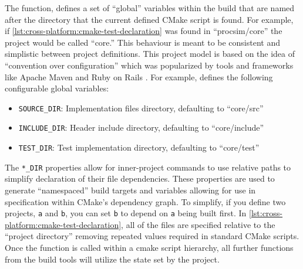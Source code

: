 The function,  defines a set of ``global'' variables within the build that are named after the directory that the current defined CMake script is found. For example, if \cref{lst:cross-platform:cmake-test-declaration} was found in ``procsim/core'' the project would be called ``core.'' This behaviour is meant to be consistent and simplistic between project definitions. This project model is based on the idea of ``convention over configuration'' which was popularized by tools and frameworks like Apache Maven and Ruby on Rails \cite{Maven:StandardDirectoryLayout,Heinemeier:RailsDoctrine}. For example,  defines the following configurable global variables: 
\begin{itemize}
    \item \texttt{SOURCE\_DIR}: Implementation files directory, defaulting to ``core/src''
    \item \texttt{INCLUDE\_DIR}: Header include directory, defaulting to ``core/include''
    \item \texttt{TEST\_DIR}: Test implementation directory, defaulting to ``core/test''
\end{itemize}
The \texttt{*\_DIR} properties allow for inner-project commands to use relative paths to simplify declaration of their file dependencies. These properties are used to generate ``namespaced'' build targets and variables allowing for use in specification within CMake's dependency graph. To simplify, if you define two projects, \verb|a| and \verb|b|, you can set \verb|b| to depend on \verb|a| being built first. In \cref{lst:cross-platform:cmake-test-declaration}, all of the files are specified relative to the ``project directory'' removing repeated values required in standard CMake scripts. Once the  function is called within a cmake script hierarchy, all further functions from the build tools will utilize the state set by the project. 

